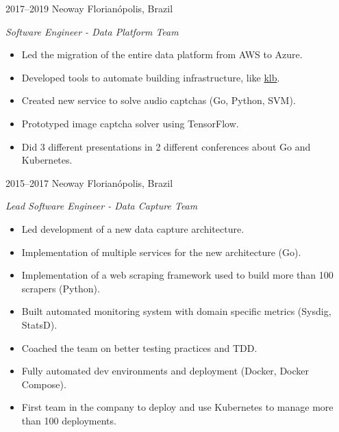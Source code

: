\documentclass[]{friggeri-cv} %
\begin{document}
\begin{entrylist}
\entry
{2017--2019}
{Neoway}
{Florianópolis, Brazil}
{\emph{Software Engineer - Data Platform Team} \\

\begin{itemize}
  \item Led the migration of the entire data platform from AWS to Azure.
  \item Developed tools to automate building infrastructure, like {\href{https://github.com/NeowayLabs/klb}{klb}}.
  \item Created new service to solve audio captchas (Go, Python, SVM).
  \item Prototyped image captcha solver using TensorFlow.
  \item Did 3 different presentations in 2 different conferences about Go and Kubernetes.
\end{itemize}
}
\end{entrylist}

\begin{entrylist}
\entry
{2015--2017}
{Neoway}
{Florianópolis, Brazil}
{\emph{Lead Software Engineer - Data Capture Team} \\

\begin{itemize}
  \item Led development of a new data capture architecture.
  \item Implementation of multiple services for the new architecture (Go).
  \item Implementation of a web scraping framework used to build more than 100 scrapers (Python).
  \item Built automated monitoring system with domain specific metrics (Sysdig, StatsD).
  \item Coached the team on better testing practices and TDD.
  \item Fully automated dev environments and deployment (Docker, Docker Compose).
  \item First team in the company to deploy and use Kubernetes to manage more than 100 deployments.
\end{itemize}
}
\end{entrylist}
\end{document}
